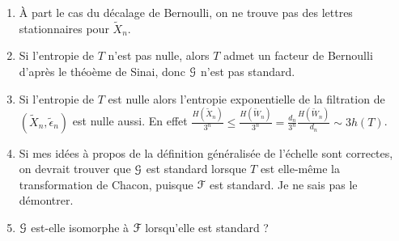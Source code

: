 \documentclass[12pt,a4paper]{article}
\begin{document}
\begin{enumerate}
\item \`A part le cas du décalage de Bernoulli, on ne trouve pas des lettres 
stationnaires pour $\widetilde{X}_n$. 

\item Si l'entropie de $T$ n'est pas nulle, alors $T$ admet un facteur 
de Bernoulli d'après le théoème de Sinai, donc $\EuScript{G}$ n'est pas standard. 

\item Si l'entropie de $T$ est nulle alors l'entropie exponentielle de la 
filtration de $(\widetilde{X}_n, \widetilde{\epsilon}_n)$ est nulle aussi. 
En effet $\frac{H(\widetilde{X}_n)}{3^n} \leq \frac{H(\widetilde{W}_n)}{3^n} = \frac{d_n}{3^n}\frac{H(\widetilde{W}_n)}{d_n} \sim 3h(T)$.

\item Si mes idées à propos de la définition généralisée de l'échelle sont correctes, 
on devrait trouver que $\EuScript{G}$ est standard lorsque $T$ est elle-même la transformation de 
Chacon, puisque $\EuScript{F}$ est standard. Je ne sais pas le démontrer. 

\item $\EuScript{G}$ est-elle isomorphe à $\EuScript{F}$ lorsqu'elle est standard ? 
\end{enumerate}
\end{document}
